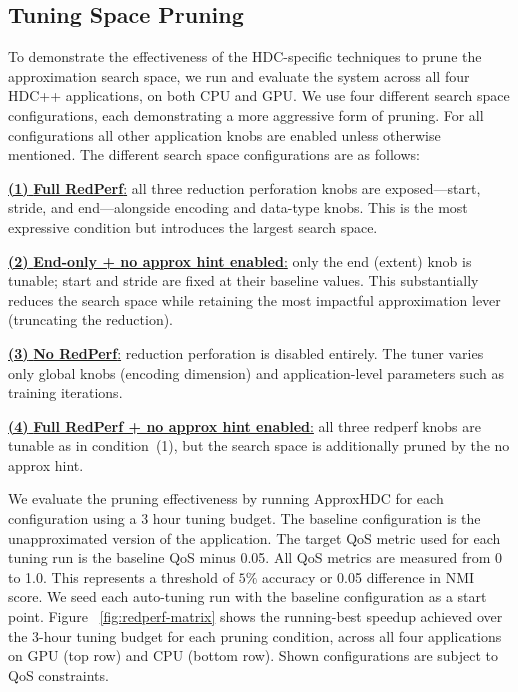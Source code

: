 \subsection{Tuning Space Pruning} 
\label{sec:eval-pruning}
To demonstrate the effectiveness of the HDC-specific techniques to prune the approximation search space, we run and evaluate the \pname{} system across all four HDC++ applications, on both CPU and GPU. We use four different search space configurations, each demonstrating a more aggressive form of pruning. For all configurations all other application knobs are enabled unless otherwise mentioned. The different search space configurations are as follows:

\vspace{0.1 in}
\noindent
\underline{\textbf{(1)} \textbf{Full RedPerf}:} all three reduction perforation knobs are exposed---start, stride, and end---alongside encoding and data-type knobs. This is the most expressive condition but introduces the largest search space.

\noindent
\underline{\textbf{(2)} \textbf{End-only + no approx hint enabled}:} only the end (extent) knob is tunable; start and stride are fixed at their baseline values. This substantially reduces the search space while retaining the most impactful approximation lever (truncating the reduction). 

\noindent
\underline{\textbf{(3)} \textbf{No RedPerf}:} reduction perforation is disabled entirely. The tuner varies only global knobs (encoding dimension) and application-level parameters such as training iterations.

\noindent
\underline{\textbf{(4)} \textbf{Full RedPerf + no approx hint enabled}:} all three redperf knobs are tunable as in condition~(1), but the search space is additionally pruned by the no approx hint.
\vspace{0.1 in}

We evaluate the pruning effectiveness by running ApproxHDC for each configuration using a 3 hour tuning budget. The baseline configuration is the unapproximated version of the application.  The target QoS metric used for each tuning run is the baseline QoS minus 0.05. All QoS metrics are measured from 0 to 1.0. This represents a threshold of $5\%$ accuracy or 0.05 difference in NMI score. We seed each auto-tuning run with the baseline configuration as a start point. Figure ~\ref{fig:redperf-matrix} shows the running-best speedup achieved over the 3-hour tuning budget for each pruning condition, across all four applications on GPU (top row) and CPU (bottom row). Shown configurations are subject to QoS constraints.

